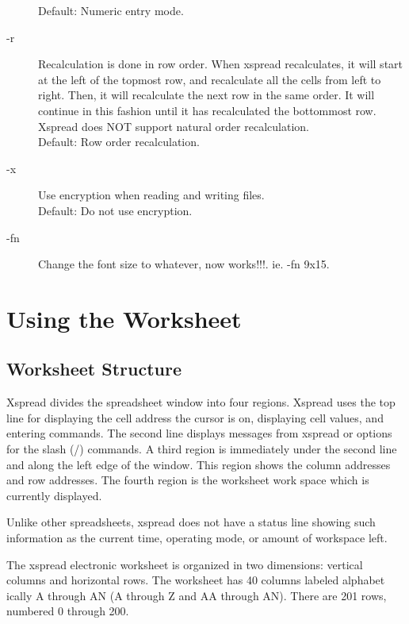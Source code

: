 \begin{description}
Default:  Numeric entry mode.
 
\item[-r]{Recalculation is done in row order.  When xspread recalculates, 
  it will start at the left of the topmost row, and recalculate all the 
  cells from left to right.  Then, it will recalculate the next row in 
  the same order.  It will continue in this fashion until it has 
  recalculated the bottommost row.\\
  Xspread does NOT support natural order recalculation.\\
  Default:  Row order recalculation.}

\item[-x]{  Use encryption when reading and writing files.\\
    Default:  Do not use encryption.}

\item[-fn]{ Change the font size to whatever, now works!!!. ie. -fn 9x15.}
\end{description}

\newpage
\section*{Using the Worksheet}

\subsection*{Worksheet Structure}

    Xspread divides the spreadsheet window into four regions.  Xspread uses 
the top line for displaying the cell address the cursor is on, displaying cell 
values, and entering commands.  The second line displays messages from xspread 
or options for the slash (/) commands.  A third region is immediately under 
the second line and along the left edge of the window.  This region shows the 
column addresses and row addresses.  The fourth region is the worksheet work 
space which is currently displayed.

    Unlike other spreadsheets, xspread does not have a status line showing 
such information as the current time, operating mode, or amount of workspace 
left.

    The xspread electronic worksheet is organized in two dimensions:  vertical 
columns and horizontal rows.  The worksheet has 40 columns labeled alphabet
ically A through AN (A through Z and AA through AN).  There are 201 rows, 
numbered 0 through 200.

